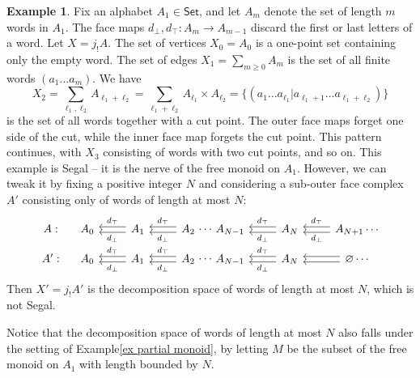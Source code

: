 \documentclass{amsart}
\theoremstyle{definition}
\newtheorem{example}[theorem]{Example}
\theoremstyle{remark}
\newcommand{\set}{\mathsf{Set}}
\begin{document}
\begin{example}\label{example words}
Fix an alphabet $A_1 \in \set$, and let $A_m$ denote the set of length $m$ words in $A_1$.
The face maps $d_\bot, d_\top \colon A_m \to A_{m-1}$ discard the first or last letters of a word.
Let $X = j_!A$.
The set of vertices $X_0 = A_0$ is a one-point set containing only the empty word.
The set of edges $X_1 = \sum_{m\geq 0} A_m$ is the set of all finite words $(a_1 \dots a_m)$.
We have
\[
  X_2 = \sum_{\ell_1, \ell_2} A_{\ell_1 + \ell_2} = \sum_{\ell_1+\ell_2} A_{\ell_1} \times A_{\ell_2} = \{ (a_1 \dots a_{\ell_1} | a_{\ell_1+1} \dots a_{\ell_1+\ell_2} ) \}
\]
is the set of all words together with a cut point.
The outer face maps forget one side of the cut, while the inner face map forgets the cut point.
This pattern continues, with $X_3$ consisting of words with two cut points, and so on.
This example is Segal -- it is the nerve of the free monoid on $A_1$.
However, we can tweak it by fixing a positive integer $N$ and considering a sub-outer face complex $A'$ consisting only of words of length at most $N$:
\begin{equation*}\label{eq truncation} 
\begin{tikzcd}[row sep=small]
A: &[-0.5cm] A_0 & 
A_1 \lar[shift left, "d_\bot"] \lar[shift right, "d_\top"'] & 
A_2 \lar[shift left, "d_\bot"] \lar[shift right, "d_\top"'] %
\rar[phantom, "\cdots"]  &[-0.5cm] 
A_{N-1} &
A_{N} \lar[shift left, "d_\bot"] \lar[shift right, "d_\top"'] &
A_{N+1} \lar[shift left, "d_\bot"] \lar[shift right, "d_\top"'] \cdots
\\
A': &[-0.5cm] A_0 & 
A_1 \lar[shift left, "d_\bot"] \lar[shift right, "d_\top"'] & 
A_2 \lar[shift left, "d_\bot"] \lar[shift right, "d_\top"'] %
\rar[phantom, "\cdots"]  &[-0.5cm] 
A_{N-1} &
A_{N} \lar[shift left, "d_\bot"] \lar[shift right, "d_\top"'] &
\varnothing \lar[shift left] \lar[shift right] \cdots
\end{tikzcd} \end{equation*}
Then $X' = j_!A'$ is the decomposition space of words of length at most $N$, which is not Segal.
\end{example}

Notice that the decomposition space of words of length at most $N$ also falls under the setting of Example\nobreakspace \ref {ex partial monoid}, by letting $M$ be the subset of the free monoid on $A_1$ with length bounded by $N$.
\end{document}

